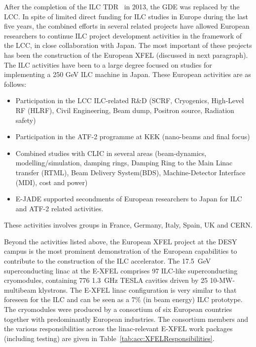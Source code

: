 \documentclass[%
 reprint,
 floatfix,
 amsmath,amssymb,
 aps,
]{revtex4-1}
\begin{document}

After the completion of the ILC TDR~\cite{Adolphsen:2013kya} in 2013, the GDE was replaced by the LCC. In spite of limited direct funding for ILC studies in Europe during the last five years, the combined efforts in several related projects have allowed European researchers to continue ILC project development activities in the framework of the LCC, in close collaboration with Japan. The most important of these projects has been the construction of the European XFEL (discussed in next paragraph). The ILC activities have been to a large degree focused on studies for implementing a 250 GeV ILC machine in Japan. These European activities are as follows:

\begin{itemize}
\item Participation in the LCC ILC-related R\&D (SCRF, Cryogenics, High-Level RF (HLRF), Civil Engineering, Beam dump, Positron source, Radiation safety)
\item Participation in the ATF-2 programme at KEK (nano-beams and final focus)
\item Combined studies with CLIC in several areas (beam-dynamics, modelling/simulation, damping rings, Damping Ring to the Main Linac transfer (RTML), Beam Delivery System(BDS), Machine-Detector Interface (MDI), cost and power)
\item E-JADE supported secondments of European researchers to Japan for ILC and ATF-2 related activities.
\end{itemize}
These activities involves groups in  France, Germany, Italy, Spain, UK and CERN. 



Beyond the activities listed above, the European XFEL project at the DESY campus is the most prominent demonstration of the European capabilities
to contribute to the construction of the ILC accelerator.
The 17.5~GeV superconducting linac at the E-XFEL comprises 97 ILC-like superconducting cryomodules, containing 776 1.3~GHz TESLA cavities
driven by 25 10-MW-multibeam klystrons. The E-XFEL linac configuration is very similar to that foreseen for the ILC and can be seen as a 7\% (in beam energy) ILC prototype. The cryomodules were produced by a consortium of six European countries together with predominantly European industries. 
 The consortium members and the various responsibilities across the linac-relevant E-XFEL work packages (including testing) are given in Table~\ref{tab:acc:XFELResponsibilities}.
\end{document}
